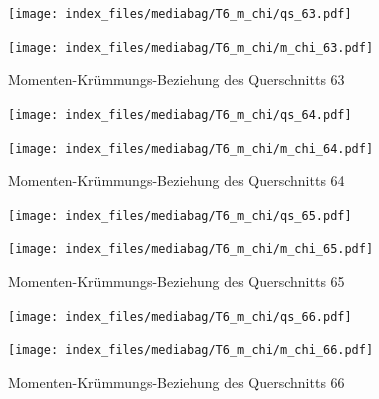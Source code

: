 \documentclass[
  11pt,
  letterpaper,
]{scrreprt}
\begin{document}
\begin{figure}[H]

\begin{minipage}{0.50\linewidth}
\texttt{[image: index\_files/mediabag/T6\_m\_chi/qs\_63.pdf]}\end{minipage}%
%
\begin{minipage}{0.50\linewidth}
\texttt{[image: index\_files/mediabag/T6\_m\_chi/m\_chi\_63.pdf]}\end{minipage}%

\caption{\label{fig-m_chi_appendix}Momenten-Krümmungs-Beziehung des
Querschnitts 63}

\end{figure}%

\begin{figure}[H]

\begin{minipage}{0.50\linewidth}
\texttt{[image: index\_files/mediabag/T6\_m\_chi/qs\_64.pdf]}\end{minipage}%
%
\begin{minipage}{0.50\linewidth}
\texttt{[image: index\_files/mediabag/T6\_m\_chi/m\_chi\_64.pdf]}\end{minipage}%

\caption{\label{fig-m_chi_appendix}Momenten-Krümmungs-Beziehung des
Querschnitts 64}

\end{figure}%

\begin{figure}[H]

\begin{minipage}{0.50\linewidth}
\texttt{[image: index\_files/mediabag/T6\_m\_chi/qs\_65.pdf]}\end{minipage}%
%
\begin{minipage}{0.50\linewidth}
\texttt{[image: index\_files/mediabag/T6\_m\_chi/m\_chi\_65.pdf]}\end{minipage}%

\caption{\label{fig-m_chi_appendix}Momenten-Krümmungs-Beziehung des
Querschnitts 65}

\end{figure}%

\begin{figure}[H]

\begin{minipage}{0.50\linewidth}
\texttt{[image: index\_files/mediabag/T6\_m\_chi/qs\_66.pdf]}\end{minipage}%
%
\begin{minipage}{0.50\linewidth}
\texttt{[image: index\_files/mediabag/T6\_m\_chi/m\_chi\_66.pdf]}\end{minipage}%

\caption{\label{fig-m_chi_appendix}Momenten-Krümmungs-Beziehung des
Querschnitts 66}

\end{figure}%
\end{document}

